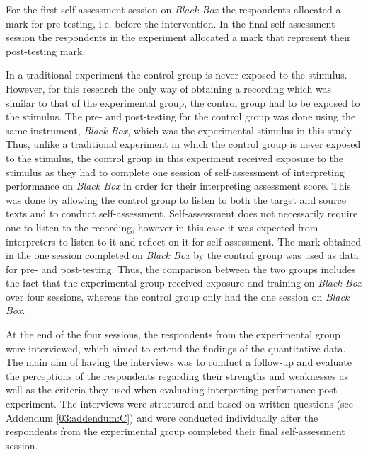 \documentclass[output=paper]{langsci/langscibook}
\begin{document}
For the first self-assessment session on \textit{Black Box} the respondents allocated a mark for pre-testing, i.e. before the intervention. In the final self-assessment session the respondents in the experiment allocated a mark that represent their post-testing mark. 

In a traditional experiment the control group is never exposed to the stimulus. However, for this research the only way of obtaining a recording which was similar to that of the experimental group, the control group had to be exposed to the stimulus. The pre- and post-testing for the control group was done using the same instrument, \textit{Black Box}, which was the experimental stimulus in this study. Thus, unlike a traditional experiment in which the control group is never exposed to the stimulus, the control group in this experiment received exposure to the stimulus as they had to complete one session of self-assessment of interpreting performance on \textit{Black Box} in order for their interpreting assessment score. This was done by allowing the control group to listen to both the target and source texts and to conduct self-assessment. Self-assessment does not necessarily require one to listen to the recording, however in this case it was expected from interpreters to listen to it and reflect on it for self-assessment. The mark obtained in the one session completed on \textit{Black Box} by the control group was used as data for pre- and post-testing. Thus, the comparison between the two groups includes the fact that the experimental group received exposure and training on \textit{Black Box} over four sessions, whereas the control group only had the one session on \textit{Black Box}.

At the end of the four sessions, the respondents from the experimental group were interviewed, which aimed to extend the findings of the quantitative data. The main aim of having the interviews was to conduct a follow-up and evaluate the perceptions of the respondents regarding their strengths and weaknesses as well as the criteria they used when evaluating interpreting performance post experiment. The interviews were structured and based on written questions (see Addendum \ref{03:addendum:C}) and were conducted individually after the respondents from the experimental group completed their final self-assessment session.
\end{document}
